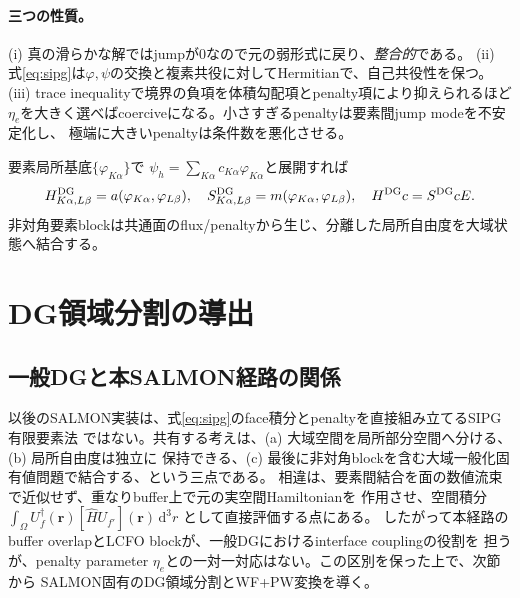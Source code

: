 \documentclass[11pt,a4paper]{article}
\newcommand{\dd}{\mathrm d}
\begin{document}
\paragraph{三つの性質。}
(i) 真の滑らかな解ではjumpが0なので元の弱形式に戻り、\emph{整合的}である。
(ii) 式\eqref{eq:sipg}は$\varphi,\psi$の交換と複素共役に対してHermitianで、自己共役性を保つ。
(iii) trace inequalityで境界の負項を体積勾配項とpenalty項により抑えられるほど
$\eta_e$を大きく選べばcoerciveになる。小さすぎるpenaltyは要素間jump modeを不安定化し、
極端に大きいpenaltyは条件数を悪化させる。

要素局所基底$\{\varphi_{K\alpha}\}$で
$\psi_h=\sum_{K\alpha}c_{K\alpha}\varphi_{K\alpha}$と展開すれば
\begin{equation}
 H^{\rm DG}_{K\alpha,L\beta}=a(\varphi_{K\alpha},\varphi_{L\beta}),
 \quad S^{\rm DG}_{K\alpha,L\beta}=m(\varphi_{K\alpha},\varphi_{L\beta}),
 \quad H^{\rm DG}c=S^{\rm DG}cE .
 \label{eq:dg-matrix}
\end{equation}
非対角要素blockは共通面のflux/penaltyから生じ、分離した局所自由度を大域状態へ結合する。

\section{DG領域分割の導出}
\subsection{一般DGと本SALMON経路の関係}
以後のSALMON実装は、式\eqref{eq:sipg}のface積分とpenaltyを直接組み立てるSIPG有限要素法
ではない。共有する考えは、(a) 大域空間を局所部分空間へ分ける、(b) 局所自由度は独立に
保持できる、(c) 最後に非対角blockを含む大域一般化固有値問題で結合する、という三点である。
相違は、要素間結合を面の数値流束で近似せず、重なりbuffer上で元の実空間Hamiltonianを
作用させ、空間積分
$\int_\Omega U_f^\dagger(\boldsymbol r)[\hat H U_{f'}](\boldsymbol r)\,\dd^3r$
として直接評価する点にある。
したがって本経路のbuffer overlapとLCFO blockが、一般DGにおけるinterface couplingの役割を
担うが、penalty parameter $\eta_e$との一対一対応はない。この区別を保った上で、次節から
SALMON固有のDG領域分割とWF+PW変換を導く。
\end{document}
